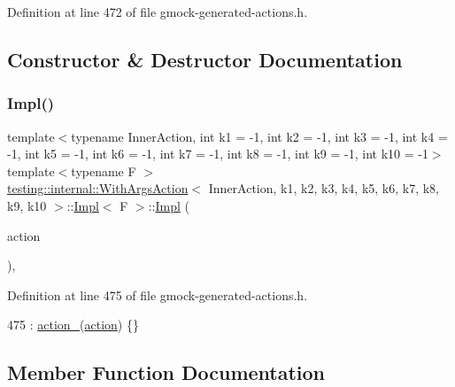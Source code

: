 Definition at line 472 of file gmock-\/generated-\/actions.\+h.



\subsection{Constructor \& Destructor Documentation}
\mbox{\label{classtesting_1_1internal_1_1WithArgsAction_1_1Impl_aab6b18195f0fd54de815bbc6379fc8c9}} 
\subsubsection{\texorpdfstring{Impl()}{Impl()}}
{\footnotesize\ttfamily template$<$typename Inner\+Action, int k1 = -\/1, int k2 = -\/1, int k3 = -\/1, int k4 = -\/1, int k5 = -\/1, int k6 = -\/1, int k7 = -\/1, int k8 = -\/1, int k9 = -\/1, int k10 = -\/1$>$ \\
template$<$typename F $>$ \\
\hyperlink{classtesting_1_1internal_1_1WithArgsAction}{testing\+::internal\+::\+With\+Args\+Action}$<$ Inner\+Action, k1, k2, k3, k4, k5, k6, k7, k8, k9, k10 $>$\+::\hyperlink{classtesting_1_1internal_1_1WithArgsAction_1_1Impl}{Impl}$<$ F $>$\+::\hyperlink{classtesting_1_1internal_1_1WithArgsAction_1_1Impl}{Impl} (\begin{DoxyParamCaption}\item[{const Inner\+Action \&}]{action }\end{DoxyParamCaption})\hspace{0.3cm}{\ttfamily [inline]}, {\ttfamily [explicit]}}



Definition at line 475 of file gmock-\/generated-\/actions.\+h.


\begin{DoxyCode}
475 : \hyperlink{classtesting_1_1internal_1_1WithArgsAction_1_1Impl_aa36bb75797d43eb853a92f02ca3e0dec}{action\_}(\hyperlink{namespaceupload_a675d13c979f1c720866d22ed1736f580}{action}) \{\}
\end{DoxyCode}


\subsection{Member Function Documentation}
\mbox{\label{classtesting_1_1internal_1_1WithArgsAction_1_1Impl_acdcb2f73c3f54e9ea639d9157d3f4e7c}} 
